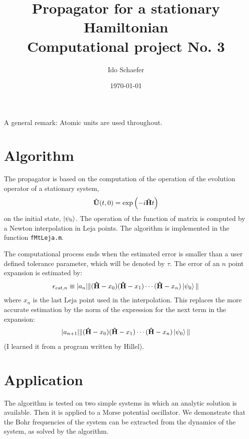 \documentclass[12pt, a4paper]{article}
\begin{document}
\title{Propagator for a stationary Hamiltonian\\
Computational project No. 3}
\author{Ido Schaefer}
\date{\today}
\maketitle

A general remark: Atomic units are used throughout.

\section{Algorithm}

The propagator is based on the computation of the operation of the evolution operator of a stationary system,
\[
	\mathbf{\hat U}(t, 0) = \exp\left(-i\mathbf{\hat H}t\right)
\]
on the initial state, $\left|\psi_0\right>$. The operation of the function of matrix is computed by a Newton interpolation in Leja points. The algorithm is implemented in the function \texttt{fMtLeja.m}.

The computational process ends when the estimated error is smaller than a user defined tolerance parameter, which will be denoted by $\tau$. The error of an $n$ point expansion is estimated by:
\begin{equation}\label{eq:Eest}
	\epsilon_{est,n} \equiv |a_n| \Vert(\mathbf{\hat H}-x_0)(\mathbf{\hat H}-x_1)\cdots(\mathbf{\hat H}-x_n)\left|\psi_0\right>\Vert
\end{equation}
where $x_n$ is the last Leja point used in the interpolation. This replaces the more accurate estimation by the norm of the expression for the next term in the expansion:
\begin{equation}
	|a_{n+1}| \Vert(\mathbf{\hat H}-x_0)(\mathbf{\hat H}-x_1)\cdots(\mathbf{\hat H}-x_n)\left|\psi_0\right>\Vert
\end{equation}
(I learned it from a program written by Hillel).

\section{Application}

The algorithm is tested on two simple systems in which an analytic solution is available. Then it is applied to a Morse potential oscillator. We demonstrate that the Bohr frequencies of the system can be extracted from the dynamics of the system, as solved by the algorithm.
\end{document}
